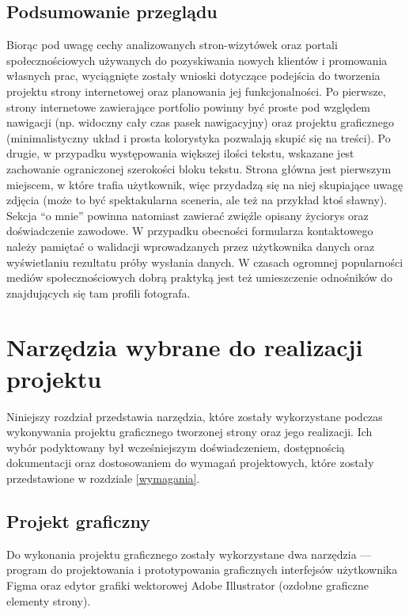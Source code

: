 \documentclass[12pt]{article}
\numberwithin{figure}{section}
\begin{document}
\begin{sloppypar}
\subsection{Podsumowanie przeglądu}

Biorąc pod uwagę cechy analizowanych stron-wizytówek oraz portali społecznościowych używanych do pozyskiwania nowych klientów i promowania własnych prac, wyciągnięte zostały wnioski dotyczące podejścia do tworzenia projektu strony internetowej oraz planowania jej funkcjonalności. Po pierwsze, strony internetowe zawierające portfolio powinny być proste pod względem nawigacji (np. widoczny cały czas pasek nawigacyjny) oraz projektu graficznego (minimalistyczny układ i prosta kolorystyka pozwalają skupić się na treści). Po drugie, w przypadku występowania większej ilości tekstu, wskazane jest zachowanie ograniczonej szerokości bloku tekstu. Strona główna jest pierwszym miejscem, w które trafia użytkownik, więc przydadzą się na niej skupiające uwagę zdjęcia (może to być spektakularna sceneria, ale też na przykład ktoś sławny). Sekcja ``o mnie'' powinna natomiast zawierać zwięźle opisany życiorys oraz doświadczenie zawodowe. W przypadku obecności formularza kontaktowego należy pamiętać o walidacji wprowadzanych przez użytkownika danych oraz wyświetlaniu rezultatu próby wysłania danych. W czasach ogromnej popularności mediów społecznościowych dobrą praktyką jest też umieszczenie odnośników do znajdujących się tam profili fotografa.


\newpage 

\section{Narzędzia wybrane do realizacji projektu}

Niniejszy rozdział przedstawia narzędzia, które zostały wykorzystane podczas wykonywania projektu graficznego tworzonej strony oraz jego realizacji. Ich wybór podyktowany był wcześniejszym doświadczeniem, dostępnością dokumentacji oraz dostosowaniem do wymagań projektowych, które zostały przedstawione w rozdziale \ref{wymagania}.


\subsection{Projekt graficzny}

Do wykonania projektu graficznego zostały wykorzystane dwa narzędzia --- program do projektowania i prototypowania graficznych interfejsów użytkownika Figma oraz edytor grafiki wektorowej Adobe Illustrator (ozdobne graficzne elementy strony). 


\end{sloppypar}
\end{document}
